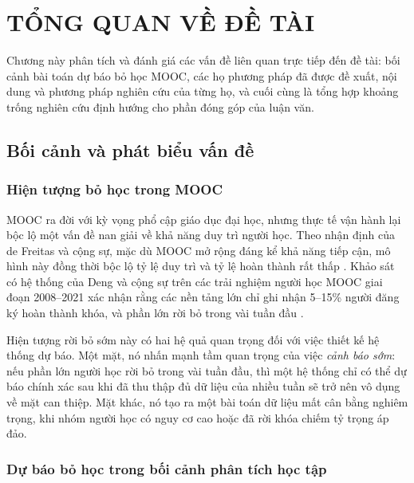 \chapter{TỔNG QUAN VỀ ĐỀ TÀI}
\label{ch:tongquan}

Chương này phân tích và đánh giá các vấn đề liên quan trực tiếp đến đề tài: bối cảnh bài toán dự báo bỏ học MOOC, các họ phương pháp đã được đề xuất, nội dung và phương pháp nghiên cứu của từng họ, và cuối cùng là tổng hợp khoảng trống nghiên cứu định hướng cho phần đóng góp của luận văn.

\section{Bối cảnh và phát biểu vấn đề}
\label{sec:boicanh}

\subsection{Hiện tượng bỏ học trong MOOC}

MOOC ra đời với kỳ vọng phổ cập giáo dục đại học, nhưng thực tế vận hành lại bộc lộ một vấn đề nan giải về khả năng duy trì người học. Theo nhận định của de Freitas và cộng sự, mặc dù MOOC mở rộng đáng kể khả năng tiếp cận, mô hình này đồng thời bộc lộ tỷ lệ duy trì và tỷ lệ hoàn thành rất thấp \cite{deFreitas2015}. Khảo sát có hệ thống của Deng và cộng sự trên các trải nghiệm người học MOOC giai đoạn 2008--2021 xác nhận rằng các nền tảng lớn chỉ ghi nhận 5--15\% người đăng ký hoàn thành khóa, và phần lớn rời bỏ trong vài tuần đầu \cite{Deng2022}.

Hiện tượng rời bỏ sớm này có hai hệ quả quan trọng đối với việc thiết kế hệ thống dự báo. Một mặt, nó nhấn mạnh tầm quan trọng của việc \emph{cảnh báo sớm}: nếu phần lớn người học rời bỏ trong vài tuần đầu, thì một hệ thống chỉ có thể dự báo chính xác sau khi đã thu thập đủ dữ liệu của nhiều tuần sẽ trở nên vô dụng về mặt can thiệp. Mặt khác, nó tạo ra một bài toán dữ liệu mất cân bằng nghiêm trọng, khi nhóm người học có nguy cơ cao hoặc đã rời khóa chiếm tỷ trọng áp đảo.

\subsection{Dự báo bỏ học trong bối cảnh phân tích học tập}


